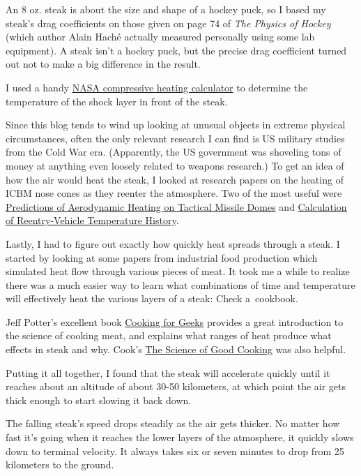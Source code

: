 {An 8 oz. steak is about the size and shape of a hockey puck, so I based my steak’s drag coefficients on those given on page 74 of \emph{The Physics of Hockey} (which author Alain Haché actually measured personally using some lab equipment). A steak isn’t a hockey puck, but the precise drag coefficient turned out not to make a big difference in the result.}

{I used a handy \href{http://www.grc.nasa.gov/WWW/BGH/stagtmp.html}{NASA compressive heating calculator} to determine the temperature of the shock layer in front of the steak.}

{Since this blog tends to wind up looking at unusual objects in extreme physical circumstances, often the only relevant research I can find is US military studies from the Cold War era. (Apparently, the US government was shoveling tons of money at anything even loosely related to weapons research.) To get an idea of how the air would heat the steak, I looked at research papers on the heating of ICBM nose cones as they reenter the atmosphere. Two of the most useful were \href{http://www.dtic.mil/cgi-bin/GetTRDoc?AD=ADA073217}{Predictions of Aerodynamic Heating on Tactical Missile Domes} and \href{http://www.dtic.mil/dtic/tr/fulltext/u2/a231552.pdf} {Calculation of Reentry-Vehicle Temperature History}.}

{Lastly, I had to figure out exactly how quickly heat spreads through a steak. I started by looking at some papers from industrial food production which simulated heat flow through various pieces of meat. It took me a while to realize there was a much easier way to learn what combinations of time and temperature will effectively heat the various layers of a steak: Check a cookbook.}

{Jeff Potter’s excellent book \href{http://www.amazon.com/Cooking-Geeks-Science-Great-Hacks/dp/0596805888}{Cooking for Geeks} provides a great introduction to the science of cooking meat, and explains what ranges of heat produce what effects in steak and why. Cook’s \href{http://www.amazon.com/Science-Cooking-Cooks-Illustrated-Cookbooks/dp/1933615982}{The Science of Good Cooking} was also helpful.}

{Putting it all together, I found that the steak will accelerate quickly until it reaches about an altitude of about 30-50 kilometers, at which point the air gets thick enough to start slowing it back down.}

{The falling steak’s speed drops steadily as the air gets thicker. No matter how fast it’s going when it reaches the lower layers of the atmosphere, it quickly slows down to terminal velocity. It always takes six or seven minutes to drop from 25 kilometers to the ground.}

